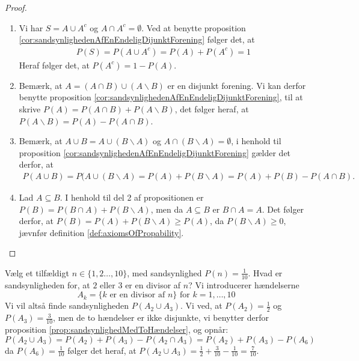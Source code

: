 \begin{proof}
\ %
\begin{enumerate}
    \item Vi har $S=A \cup A^c$ og $A \cap A^c=\emptyset$. Ved at benytte proposition \ref{cor:sandsynlighedenAfEnEndeligDijunktForening} følger det, at 
\begin{align*}
    P(S)=P(A \cup A^c) = P(A) + P(A^c) = 1
\end{align*}
Heraf følger det, at $P(A^c) = 1 - P(A)$.
    
    \item Bemærk, at $A = (A \cap B) \cup (A \backslash B)$ er en disjunkt forening. Vi kan derfor benytte proposition \ref{cor:sandsynlighedenAfEnEndeligDijunktForening}, til at skrive
    $P(A) = P(A \cap B) + P(A \backslash B)$, det følger heraf, at $P(A \backslash B) = P(A) - P(A \cap B)$.
    
    \item Bemærk, at $A\cup B=A\cup (B\backslash A)$ og $A\cap (B \backslash A)=\emptyset$, i henhold til proposition \ref{cor:sandsynlighedenAfEnEndeligDijunktForening} gælder det derfor, at
    \begin{align*}
        P(A\cup B) = P(A \cup (B \backslash A) = P(A)+P(B\backslash A)=P(A)+P(B)-P(A\cap B).
    \end{align*}
    
    \item Lad $A \subseteq B$. I henhold til del 2 af propositionen er $P(B) = P(B \cap A) + P(B \backslash A)$, men da $A \subseteq B$ er $B \cap A = A$. Det følger derfor, at $P(B) = P(A) + P(B \backslash A) \geq P(A)$, da $P(B \backslash A) \geq 0$, jævnfør definition \ref{def:axiomsOfPropability}.
\end{enumerate}
\end{proof}


 
\begin{exmp} %
Vælg et tilfældigt $n \in \{1, 2 \ldots, 10\}$, med sandsynlighed $P(n)=\frac{1}{10}$. Hvad er sandsynligheden for, at $2$ eller $3$ er en divisor af $n$?
Vi introducerer hændelserne
\begin{equation*}
    A_k = \{k \text{ er en divisor af } n\} \text{ for } k = 1, \ldots, 10  
\end{equation*}
Vi vil altså finde sandsynligheden $P(A_2 \cup A_3)$. Vi ved, at $P(A_2) = \frac{1}{2}$ og $P(A_3) = \frac{3}{10}$, men de to hændelser er ikke disjunkte, vi benytter derfor proposition \ref{prop:sandsynlighedMedToHændelser}, og opnår:
\begin{equation*}
    P(A_2 \cup A_3) = P(A_2) + P(A_3) - P(A_2 \cap A_3) = P(A_2) + P(A_3) - P(A_6)
\end{equation*}
da $P(A_6) = \frac{1}{10}$ følger det heraf, at $P(A_2 \cup A_3) = \frac{1}{2} + \frac{3}{10} - \frac{1}{10} = \frac{7}{10}$.
\end{exmp}



